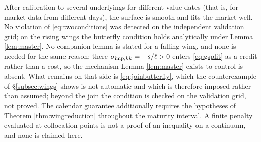After calibration to several underlyings for different value dates (that is, for market data from different days), the surface is smooth and fits the market well. No violation of \eqref{eq:twoconditions} was detected on the independent validation grid; on the rising wings the butterfly condition holds analytically under Lemma \ref{lem:master}. No companion lemma is stated for a falling wing, and none is needed for the same reason: there $\sigma_{\mathrm{imp},kk}=-s/\ell>0$ enters \eqref{eq:gsplit} as a credit rather than a cost, so the mechanism Lemma \ref{lem:master} exists to control is absent. What remains on that side is \eqref{eq:joinbutterfly}, which the counterexample of \S\ref{subsec:wings} shows is not automatic and which is therefore imposed rather than assumed; beyond the join the condition is checked on the validation grid, not proved. The calendar guarantee additionally requires the hypotheses of Theorem \ref{thm:wingreduction} throughout the maturity interval. A finite penalty evaluated at collocation points is not a proof of an inequality on a continuum, and none is claimed here. 










